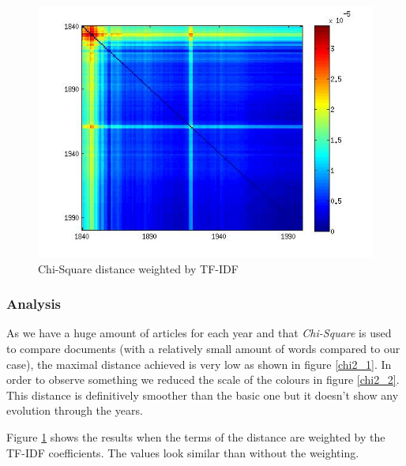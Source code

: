 \begin{figure}[H]
    \begin{minipage}[b]{0.48\linewidth}
        \includegraphics[scale=0.3]{Pictures/chi2/chi2_corrected_tfidf.jpg}
        \caption{Chi-Square distance weighted by TF-IDF}
        \label{chi2_tfidf}
    \end{minipage}\hfill
\end{figure}

\subsubsection{Analysis}

As we have a huge amount of articles for each year and that \emph{Chi-Square} is used to compare documents (with a relatively small amount of words compared to our case), the maximal distance achieved is very low as shown in figure \ref{chi2_1}. In order to observe something we reduced the scale of the colours in figure \ref{chi2_2}. This distance is definitively smoother than the basic one but it doesn't show any evolution through the years.

Figure \ref{chi2_tfidf} shows the results when the terms of the distance are weighted by the TF-IDF coefficients. The values look similar than without the weighting.